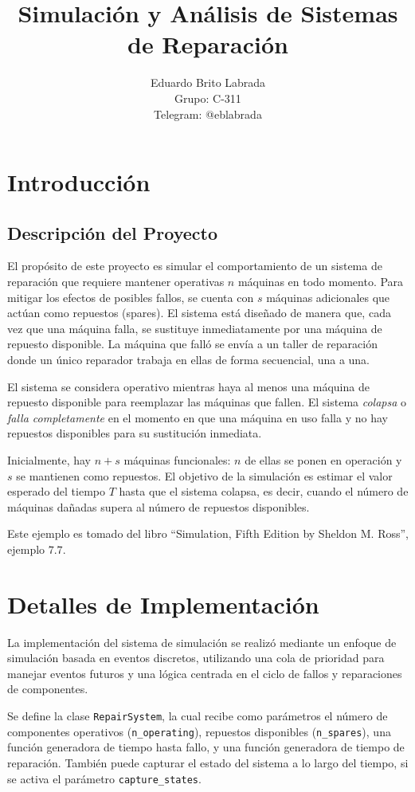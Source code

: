 \documentclass{article}
\title{Simulación y Análisis de Sistemas de Reparación}
\author{Eduardo Brito Labrada \\ Grupo: C-311 \\ Telegram: @eblabrada}
\date{}
\begin{document}
\maketitle

\section{Introducción}
\subsection{Descripción del Proyecto}

El propósito de este proyecto es simular el comportamiento de un sistema de reparación que requiere mantener operativas $n$ máquinas en todo momento. Para mitigar los efectos de posibles fallos, se cuenta con $s$ máquinas adicionales que actúan como repuestos (spares). El sistema está diseñado de manera que, cada vez que una máquina falla, se sustituye inmediatamente por una máquina de repuesto disponible. La máquina que falló se envía a un taller de reparación donde un único reparador trabaja en ellas de forma secuencial, una a una.

El sistema se considera operativo mientras haya al menos una máquina de repuesto disponible para reemplazar las máquinas que fallen. El sistema \textit{colapsa} o \textit{falla completamente} en el momento en que una máquina en uso falla y no hay repuestos disponibles para su sustitución inmediata.

Inicialmente, hay $n + s$ máquinas funcionales: $n$ de ellas se ponen en operación y $s$ se mantienen como repuestos. El objetivo de la simulación es estimar el valor esperado del tiempo $T$ hasta que el sistema colapsa, es decir, cuando el número de máquinas dañadas supera al número de repuestos disponibles.

Este ejemplo es tomado del libro ``Simulation, Fifth Edition by Sheldon M. Ross'', ejemplo $7.7$.

\section{Detalles de Implementación}

La implementación del sistema de simulación se realizó mediante un enfoque de simulación basada en eventos discretos, utilizando una cola de prioridad para manejar eventos futuros y una lógica centrada en el ciclo de fallos y reparaciones de componentes.

Se define la clase \texttt{RepairSystem}, la cual recibe como parámetros el número de componentes operativos (\texttt{n\_operating}), repuestos disponibles (\texttt{n\_spares}), una función generadora de tiempo hasta fallo, y una función generadora de tiempo de reparación. También puede capturar el estado del sistema a lo largo del tiempo, si se activa el parámetro \texttt{capture\_states}.
\end{document}
